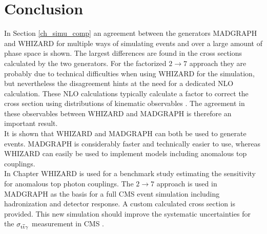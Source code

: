 \section{Conclusion}

In Section \ref{ch_simu_comp} an agreement between the generators MADGRAPH and WHIZARD for multiple ways of simulating \ttgamma events and over a large amount of phase space is shown. The largest differences are found in the cross sections calculated by the two generators. For the factorized $2 \to 7$ approach they are probably due to technical difficulties when using WHIZARD for the simulation, but nevertheless the disagreement hints at the need for a dedicated NLO calculation. These NLO calculations typically calculate a factor to correct the cross section using distributions of kinematic observables . The agreement in these observables between WHIZARD and MADGRAPH is therefore an important result.\\
It is shown that WHIZARD and MADGRAPH can both be used to generate \ttgamma events. MADGRAPH is considerably faster and technically easier to use, whereas WHIZARD can easily be used to implement models including anomalous top couplings. \\
In Chapter  WHIZARD is used for a benchmark study estimating the sensitivity for anomalous top photon couplings. The $2 \to 7$ approach is used in MADGRAPH as the basis for a full CMS event simulation  including hadronization and detector response. A custom calculated cross section is provided.  This new simulation should improve the systematic uncertainties for the $\sigma_{\mathrm{t}\overline{\mathrm{t}} \gamma}$ measurement in CMS . 